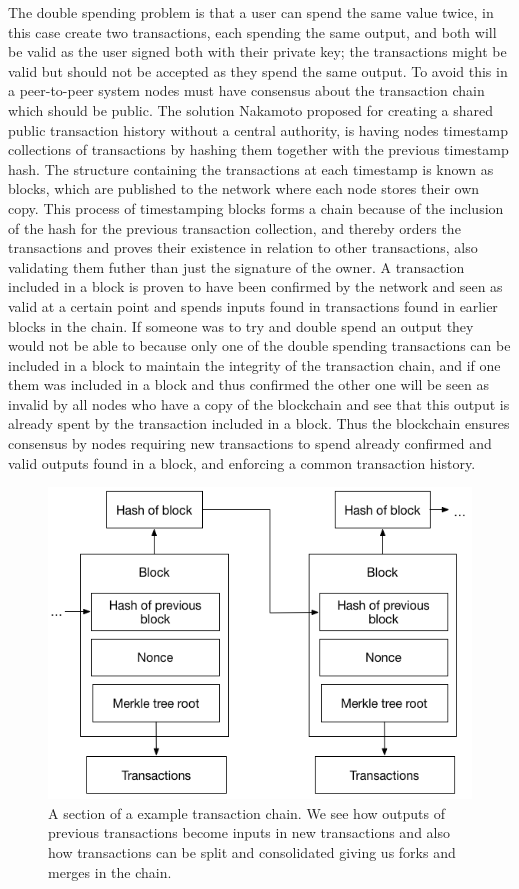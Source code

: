 The double spending problem is that a user can spend the same value twice, in this case create two transactions, each spending the same output, and both will be valid as the user signed both with their private key; the transactions might be valid but should not be accepted as they spend the same output. To avoid this in a peer-to-peer system nodes must have consensus about the transaction chain which should be public. The solution Nakamoto \cite{nakamoto2008bitcoin} proposed for creating a shared public transaction history without a central authority, is having nodes timestamp collections of transactions by hashing them together with the previous timestamp hash. 
 The structure containing the transactions at each timestamp is known as blocks, which are published to the network where each node stores their own copy. 
This process of timestamping blocks forms a chain because of the inclusion of the hash for the previous transaction collection, and thereby orders the transactions and proves their existence in relation to other transactions, also validating them futher than just the signature of the owner. A transaction included in a block is proven to have been confirmed by the network and seen as valid at a certain point and spends inputs found in transactions found in earlier blocks in the chain. If someone was to try and double spend an output they would not be able to because only one of the double spending transactions can be included in a block to maintain the integrity of the transaction chain, and if one them was included in a block and thus confirmed the other one will be seen as invalid by all nodes who have a copy of the blockchain and see that this output is already spent by the transaction included in a block. Thus the blockchain ensures consensus by nodes requiring new transactions to spend already confirmed and valid outputs found in a block, and enforcing a common transaction history.

\begin{figure}[h]  %
  \centering
  \includegraphics[width=.7\textwidth]{figures/blockchain}
  \caption[Transaction chain]{A section of a example transaction chain. We see how outputs of previous transactions become inputs in new transactions and also how transactions can be split and consolidated giving us forks and merges in the chain.}
  \label{fig:blockchain}
\end{figure}

